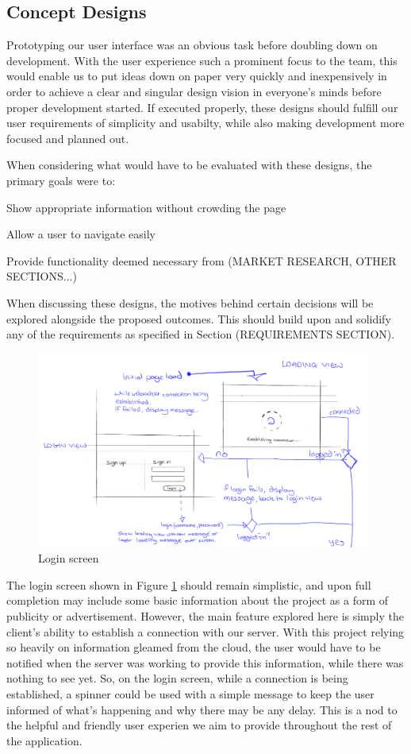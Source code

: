 \documentclass{l3proj}
\begin{document}
\subsection{Concept Designs}

Prototyping our user interface was an obvious task before doubling down on development. With the user experience such a prominent focus to the team, this would enable us to put ideas down on paper very quickly and inexpensively in order to achieve a clear and singular design vision in everyone's minds before proper development started. If executed properly, these designs should fulfill our user requirements of simplicity and usabilty, while also making development more focused and planned out.

When considering what would have to be evaluated with these designs, the primary goals were to:

Show appropriate information without crowding the page

Allow a user to navigate easily

Provide functionality deemed necessary from (MARKET RESEARCH, OTHER SECTIONS...)

When discussing these designs, the motives behind certain decisions will be explored alongside the proposed outcomes. This should build upon and solidify any of the requirements as specified in Section (REQUIREMENTS SECTION).

\begin{figure}[H]
\centering
\includegraphics[width=110mm]{Concept_Designs/Login.png}
\caption{Login screen}
\label{fig:Login}
\end{figure}

The login screen shown in Figure \ref{fig:Login} should remain simplistic, and upon full completion may include some basic information about the project as a form of publicity or advertisement. However, the main feature explored here is simply the client's ability to establish a connection with our server.  With this project relying so heavily on information gleamed from the cloud, the user would have to be notified when the server was working to provide this information, while there was nothing to see yet. So, on the login screen, while a connection is being established, a spinner could be used with a simple message to keep the user informed of what's happening and why there may be any delay. This is a nod to the helpful and friendly user experien we aim to provide throughout the rest of the application.
\end{document}

